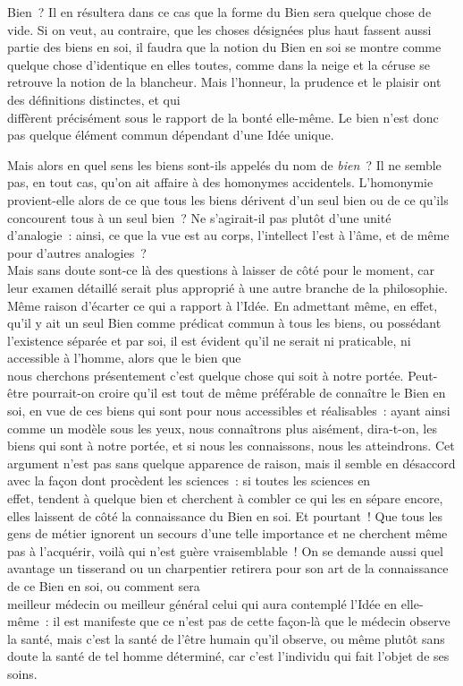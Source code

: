 \documentclass[french,twoside]{book} %
\begin{document}
Bien ? Il en résultera dans ce cas que la forme du Bien sera quelque chose de vide. Si on veut, au contraire, que les choses désignées plus haut fassent aussi partie des biens en soi, il faudra que la notion du Bien en soi se montre comme quelque chose d’identique en elles toutes, comme dans la neige et la céruse se retrouve la notion de la blancheur. Mais l’honneur, la prudence et le plaisir ont des définitions distinctes, et qui \\
diffèrent précisément sous le rapport de la bonté elle-même. Le bien n’est donc pas quelque élément commun dépendant d’une Idée unique.\par
Mais alors en quel sens les biens sont-ils appelés du nom de {\itshape bien} ? Il ne semble pas, en tout cas, qu’on ait affaire à des homonymes accidentels. L’homonymie provient-elle alors de ce que tous les biens dérivent d’un seul bien ou de ce qu’ils concourent tous à un seul bien ? Ne s’agirait-il pas plutôt d’une unité d’analogie : ainsi, ce que la vue est au corps, l’intellect l’est à l’âme, et de même pour d’autres analogies ? \\
Mais sans doute sont-ce là des questions à laisser de côté pour le moment, car leur examen détaillé serait plus approprié à une autre branche de la philosophie. Même raison d’écarter ce qui a rapport à l’Idée. En admettant même, en effet, qu’il y ait un seul Bien comme prédicat commun à tous les biens, ou possédant l’existence séparée et par soi, il est évident qu’il ne serait ni praticable, ni accessible à l’homme, alors que le bien que \\
nous cherchons présentement c’est quelque chose qui soit à notre portée. Peut-être pourrait-on croire qu’il est tout de  même préférable de connaître le Bien en soi, en vue de ces biens qui sont pour nous accessibles et réalisables : ayant ainsi comme un modèle sous les yeux, nous connaîtrons plus aisément, dira-t-on, les biens qui sont à notre portée, et si nous les connaissons, nous les atteindrons. Cet argument n’est pas sans quelque apparence de raison, mais il semble en désaccord avec la façon dont procèdent les sciences : si toutes les sciences en \\
effet, tendent à quelque bien et cherchent à combler ce qui les en sépare encore, elles laissent de côté la connaissance du Bien en soi. Et pourtant ! Que tous les gens de métier ignorent un secours d’une telle importance et ne cherchent même pas à l’acquérir, voilà qui n’est guère vraisemblable ! On se demande aussi quel avantage un tisserand ou un charpentier retirera pour son art de la connaissance de ce Bien en soi, ou comment sera \\
meilleur médecin ou meilleur général celui qui aura contemplé l’Idée en elle-même : il est manifeste que ce n’est pas de cette façon-là que le médecin observe la santé, mais c’est la santé de l’être humain qu’il observe, ou même plutôt sans doute la santé de tel homme déterminé, car c’est l’individu qui fait l’objet de ses soins.
\end{document}
